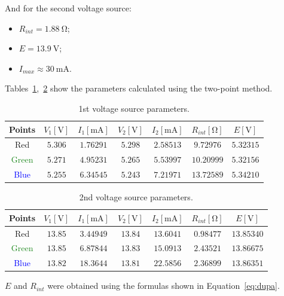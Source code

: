 And for the second voltage source:
\begin{itemize}
	\item $R_{int} =  \SI{1.88}{\ohm}$;
	\item $E=\SI{13.9}{\volt}$;
	\item $I_{max}\approx \SI{30}{\milli\ampere} $.
\end{itemize}

Tables~\ref{tab:1},~\ref{tab:22} show the parameters calculated using the two-point method.

\begin{table}[H]
	\centering
	\begin{tabular}{  c | c | c | c | c | c | c}
		Points & $V_1 [\unit{\volt}]$ & $I_1 [\unit{\milli\ampere}]$ & $V_2 [\unit{\volt}]$ & $I_2 [\unit{\milli\ampere}]$ & $R_{int} [\unit{\ohm}]$ & $E [\unit{\volt}]$ \\
		\hline
		\textcolor{BrickRed}{Red} & $5.306$ & $1.76291$ & $5.298$ & $2.58513$ & $9.72976$ & $5.32315$ \\
		\textcolor{ForestGreen}{Green} & $5.271$ & $4.95231$ & $5.265$ & $5.53997$ & $10.20999$ & $5.32156$ \\
		\textcolor{blue}{Blue} & $5.255$ & $6.34545$ & $5.243$ & $7.21971$ & $13.72589$ & $5.34210$ \\
		
	\end{tabular}
	\caption{1st voltage source parameters.}
	\label{tab:1}
\end{table}

\begin{table}[H]
	\centering
	\begin{tabular}{  c | c | c | c | c | c | c}
		Points & $V_1 [\unit{\volt}]$ & $I_1 [\unit{\milli\ampere}]$ & $V_2 [\unit{\volt}]$ & $I_2 [\unit{\milli\ampere}]$ & $R_{int} [\unit{\ohm}]$ & $E [\unit{\volt}]$ \\
		\hline
			\textcolor{BrickRed}{Red} & $13.85$ & $3.44949$ & $13.84$ & $13.6041$ & $0.98477$ & $13.85340$ \\
		\textcolor{ForestGreen}{Green} & $13.85$ & $6.87844$ & $13.83$ & $15.0913$ & $2.43521$ & $13.86675$ \\
		\textcolor{blue}{Blue}  & $13.82$ & $18.3644$ & $13.81$ & $22.5856$ & $2.36899$ & $13.86351$ \\
	\end{tabular}
	\caption{2nd voltage source parameters.}
	\label{tab:22}
\end{table}

$E$ and $R_{int}$ were obtained using the formulas shown in Equation~\ref{eq:dupa}.

